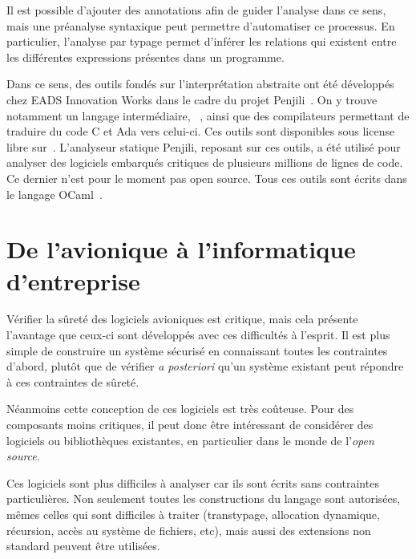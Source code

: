 Il est possible d'ajouter des annotations afin de guider l'analyse dans ce sens,
mais une préanalyse syntaxique peut permettre d'automatiser ce processus. En
particulier, l'analyse par typage permet d'inférer les relations qui existent
entre les différentes expressions présentes dans un programme.

Dans ce sens, des outils fondés sur l'interprétation abstraite ont été
développés chez EADS Innovation Works dans le cadre du projet
Penjili~\cite{AllamigeonHymansSSTIC07}. On y trouve notamment un langage
intermédiaire, \newspeak~\cite{newspeak}, ainsi que des compilateurs permettant
de traduire du code C et Ada vers celui-ci. Ces outils sont disponibles sous
license libre sur~. L'analyseur statique Penjili, reposant sur ces
outils, a été utilisé pour analyser des logiciels embarqués critiques de
plusieurs millions de lignes de code. Ce dernier n'est pour le moment pas open
source. Tous ces outils sont écrits dans le langage OCaml~\cite{DAOC}.

\section{De l'avionique à l'informatique d'entreprise}

Vérifier la sûreté des logiciels avioniques est critique, mais cela présente
l'avantage que ceux-ci sont développés avec ces difficultés à l'esprit. Il est
plus simple de construire un système sécurisé en connaissant toutes les
contraintes d'abord, plutôt que de vérifier \emph{a posteriori} qu'un système
existant peut répondre à ces contraintes de sûreté.

Néanmoins cette conception de ces logiciels est très coûteuse. Pour des
composants moins critiques, il peut donc être intéressant de considérer des
logiciels ou bibliothèques existantes, en particulier dans le monde de
l'\emph{open source}.

Ces logiciels sont plus difficiles à analyser car ils sont écrits sans
contraintes particulières. Non seulement toutes les constructions du langage
sont autorisées, mêmes celles qui sont difficiles à traiter (transtypage,
allocation dynamique, récursion, accès au système de fichiers, etc), mais aussi
des extensions non standard peuvent être utilisées.


